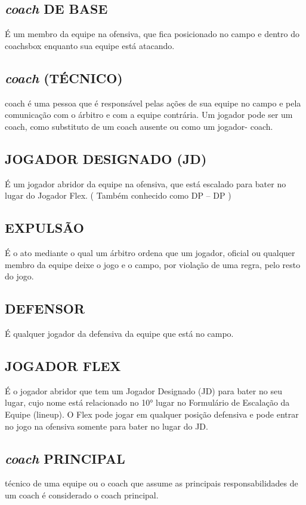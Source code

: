 \subsection{\textit{coach} DE BASE}
É um membro da equipe na ofensiva, que fica posicionado no campo e dentro do \gls{coachsbox}
enquanto sua equipe está atacando.

\subsection{\textit{coach} (TÉCNICO)}
\gls{coach} é uma pessoa que é responsável pelas ações de sua equipe no campo e pela comunicação com o árbitro e com a equipe contrária. Um jogador pode ser um \gls{coach}, como substituto de um \gls{coach} ausente ou como um jogador- \gls{coach}.

\subsection{JOGADOR DESIGNADO (JD)}
É um jogador abridor da equipe na ofensiva, que está escalado para bater no lugar do Jogador Flex. ( Também conhecido como DP --  \gls{DP} )

\subsection{EXPULSÃO}
É o ato mediante o qual um árbitro ordena que um jogador, oficial ou qualquer membro da equipe deixe o jogo e o campo, por violação de uma regra, pelo resto do jogo.

\subsection{DEFENSOR}
É qualquer jogador da defensiva da equipe que está no campo.

\subsection{JOGADOR FLEX}
É o jogador abridor que tem um Jogador Designado (JD) para bater no seu lugar, cujo nome está relacionado no 10° lugar no Formulário de Escalação da Equipe (\gls{lineup}). O Flex pode jogar em qualquer posição defensiva e pode entrar no jogo na ofensiva somente para bater no lugar do JD.

\subsection{\textit{coach} PRINCIPAL}
técnico de uma equipe ou o \gls{coach} que assume as principais responsabilidades de um \gls{coach} é considerado o \gls{coach} principal.
